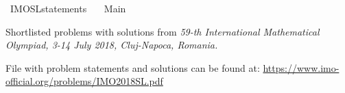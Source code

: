 %
\begin{isabellebody}%
%
%
\isadelimdocument
%
\endisadelimdocument
%
\isatagdocument
%
\isamarkuptrue%
%
\endisatagdocument
{\isafolddocument}%
%
\isadelimdocument
%
\endisadelimdocument
%
\isadelimtheory
%
\endisadelimtheory
%
\isatagtheory
{}\isamarkupfalse%
\ IMO{\isacharunderscore}{}{}{}{}{\isacharunderscore}SL{\isacharunderscore}statements\isanewline
\ \ \ Main\isanewline
\isanewline
{}%
\endisatagtheory
{\isafoldtheory}%
%
\isadelimtheory
%
\endisadelimtheory
%
\begin{isamarkuptext}%
Shortlisted problems with solutions from \emph{59-th International Mathematical Olympiad, 3-14 July 2018, Cluj-Napoca, Romania.}

File with problem statements and solutions can be found at:
\url{https://www.imo-official.org/problems/IMO2018SL.pdf}%
\end{isamarkuptext}\isamarkuptrue%
%
\isadelimtheory
%
\endisadelimtheory
%
\isatagtheory
{}\isamarkupfalse%
%
\endisatagtheory
{\isafoldtheory}%
%
\isadelimtheory
%
\endisadelimtheory
%
\end{isabellebody}%
\endinput
